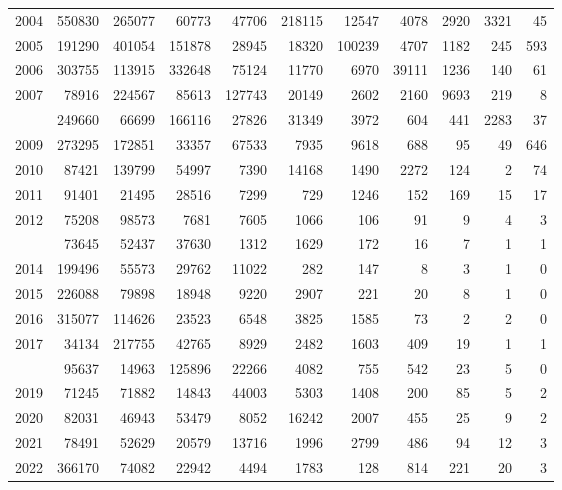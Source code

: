 \documentclass[
]{article}
\begin{document}
\begin{longtable}[t]{lrrrrrrrrrr}
2004 & 550830 & 265077 & 60773 & 47706 & 218115 & 12547 & 4078 & 2920 & 3321 & 45\\
2005 & 191290 & 401054 & 151878 & 28945 & 18320 & 100239 & 4707 & 1182 & 245 & 593\\
2006 & 303755 & 113915 & 332648 & 75124 & 11770 & 6970 & 39111 & 1236 & 140 & 61\\
2007 & 78916 & 224567 & 85613 & 127743 & 20149 & 2602 & 2160 & 9693 & 219 & 8\\
\addlinespace
2008 & 249660 & 66699 & 166116 & 27826 & 31349 & 3972 & 604 & 441 & 2283 & 37\\
2009 & 273295 & 172851 & 33357 & 67533 & 7935 & 9618 & 688 & 95 & 49 & 646\\
2010 & 87421 & 139799 & 54997 & 7390 & 14168 & 1490 & 2272 & 124 & 2 & 74\\
2011 & 91401 & 21495 & 28516 & 7299 & 729 & 1246 & 152 & 169 & 15 & 17\\
2012 & 75208 & 98573 & 7681 & 7605 & 1066 & 106 & 91 & 9 & 4 & 3\\
\addlinespace
2013 & 73645 & 52437 & 37630 & 1312 & 1629 & 172 & 16 & 7 & 1 & 1\\
2014 & 199496 & 55573 & 29762 & 11022 & 282 & 147 & 8 & 3 & 1 & 0\\
2015 & 226088 & 79898 & 18948 & 9220 & 2907 & 221 & 20 & 8 & 1 & 0\\
2016 & 315077 & 114626 & 23523 & 6548 & 3825 & 1585 & 73 & 2 & 2 & 0\\
2017 & 34134 & 217755 & 42765 & 8929 & 2482 & 1603 & 409 & 19 & 1 & 1\\
\addlinespace
2018 & 95637 & 14963 & 125896 & 22266 & 4082 & 755 & 542 & 23 & 5 & 0\\
2019 & 71245 & 71882 & 14843 & 44003 & 5303 & 1408 & 200 & 85 & 5 & 2\\
2020 & 82031 & 46943 & 53479 & 8052 & 16242 & 2007 & 455 & 25 & 9 & 2\\
2021 & 78491 & 52629 & 20579 & 13716 & 1996 & 2799 & 486 & 94 & 12 & 3\\
2022 & 366170 & 74082 & 22942 & 4494 & 1783 & 128 & 814 & 221 & 20 & 3\\*
\end{longtable}
\end{document}
